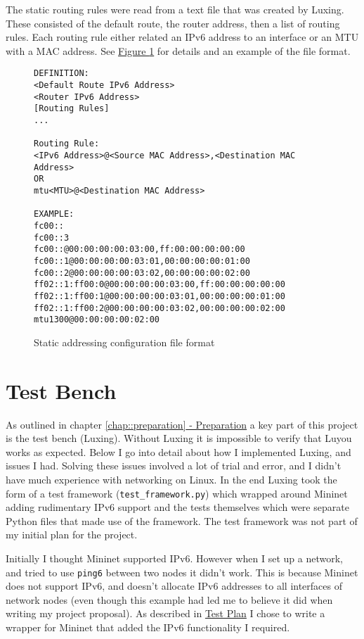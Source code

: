 \documentclass[12pt,a4paper,twoside,openany]{report}
\begin{document}
\bigskip

The static routing rules were read from a text file that was created by Luxing. These consisted of the default route, the router address, then a list of routing rules.  Each routing rule either related an IPv6 address to an interface or an MTU with a MAC address. See \hyperref[fig::config_file]{Figure }\ref{fig::config_file} for details and an example of the file format. 

\begin{figure}
\begin{varwidth}{\linewidth}
\begin{verbatim}
DEFINITION:
<Default Route IPv6 Address>
<Router IPv6 Address>
[Routing Rules]
...

Routing Rule:
<IPv6 Address>@<Source MAC Address>,<Destination MAC Address>
OR
mtu<MTU>@<Destination MAC Address>

EXAMPLE:
fc00::
fc00::3
fc00::@00:00:00:00:03:00,ff:00:00:00:00:00
fc00::1@00:00:00:00:03:01,00:00:00:00:01:00
fc00::2@00:00:00:00:03:02,00:00:00:00:02:00
ff02::1:ff00:0@00:00:00:00:03:00,ff:00:00:00:00:00
ff02::1:ff00:1@00:00:00:00:03:01,00:00:00:00:01:00
ff02::1:ff00:2@00:00:00:00:03:02,00:00:00:00:02:00
mtu1300@00:00:00:00:02:00
\end{verbatim}
\end{varwidth}
\caption{Static addressing configuration file format}
\label{fig::config_file}
\end{figure}

\section{Test Bench}

As outlined in chapter \ref{chap::preparation}\hyperref[chap::preparation]{ - Preparation} a key part of this project is the test bench (Luxing). Without Luxing it is impossible to verify that Luyou works as expected.  Below I go into detail about how I implemented Luxing, and issues I had.  Solving these issues involved a lot of trial and error, and I didn't have much experience with networking on Linux.  In the end Luxing took the form of a test framework (\verb!test_framework.py!) which wrapped around Mininet adding rudimentary IPv6 support and the tests themselves which were separate Python files that made use of the framework. The test framework was not part of my initial plan for the project.

\bigskip

Initially I thought Mininet\cite{mininet} supported IPv6.  However when I set up a network, and tried to use \verb!ping6! between two nodes it didn't work.  This is because Mininet does not support IPv6, and doesn't allocate IPv6 addresses to all interfaces of network nodes (even though this example\cite{tw_mininet} had led me to believe it did when writing my project proposal).  As described in \hyperref[sec::test_plan]{Test Plan} I chose to write a wrapper for Mininet that added the IPv6 functionality I required.  
\end{document}
